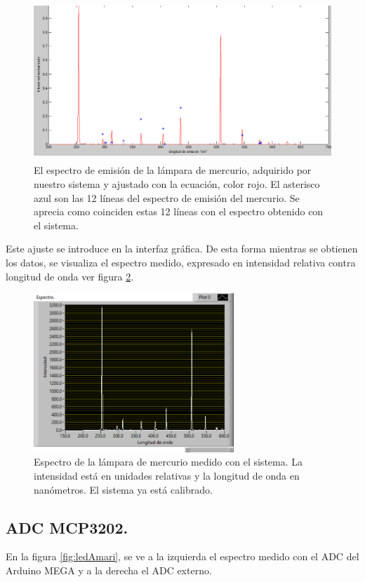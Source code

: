 \begin{figure}[h!]
	\centering
	\includegraphics[width=0.8\linewidth,height=6cm]{Imagenes/3/compararLP}
	\caption{El espectro de emisión de la lámpara de mercurio, adquirido por nuestro sistema y ajustado con la ecuación, color rojo. El asterisco azul son las 12 líneas del espectro de emisión del mercurio. Se aprecia como coinciden estas 12 líneas con el espectro obtenido con el sistema.}
	\label{fig:compararlp}
\end{figure}
Este ajuste se introduce en la interfaz gráfica. De esta forma mientras se obtienen los datos, se visualiza el espectro medido, expresado en intensidad relativa contra longitud de onda ver figura \ref{fig:labviewmedir}.\\
\begin{figure}[h!]
	\centering
	\includegraphics[width=0.8 \linewidth, height=6cm]{Imagenes/3/LabViewMedir}
	\caption{Espectro de la lámpara de mercurio medido con el sistema. La intensidad está en unidades relativas y la longitud de onda en nanómetros. El sistema ya está calibrado.}
	\label{fig:labviewmedir}
\end{figure}

\subsection{ADC MCP3202.}
En la figura \ref{fig:ledAmari}, se ve a la izquierda el espectro medido con el ADC del Arduino MEGA y a la derecha el ADC externo. 

